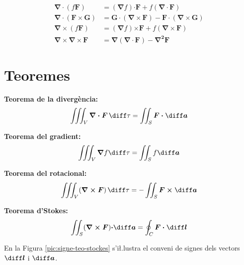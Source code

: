 \documentclass[catalan,a4paper,twoside,11pt]{article}
\begin{document}
\begin{align}
    \boldsymbol{\nabla\cdot}(f\boldsymbol{F}) &=
    (\boldsymbol{\nabla}f)\boldsymbol{\cdot F} + f(\boldsymbol{\nabla\cdot F})\\[0.5ex]
    \boldsymbol{\nabla\cdot}(\boldsymbol{F\times G}) &=
    \boldsymbol{G\cdot}(\boldsymbol{\nabla\times F}) -
    \boldsymbol{F\cdot}(\boldsymbol{\nabla\times G})\\[0.5ex]
    \boldsymbol{\nabla\times}(f\boldsymbol{F}) &=
    (\boldsymbol{\nabla}f)\boldsymbol{\times F} + f(\boldsymbol{\nabla\times F})\\[0.5ex]
    \boldsymbol{\nabla\times\nabla\times F} &= \boldsymbol{\nabla}(\boldsymbol{\nabla\cdot F})
    - \boldsymbol{\nabla^2 F}
\end{align}

\section{Teoremes }

\textbf{Teorema de la diverg\`{e}ncia:}
\begin{equation}
    \iiint_V\boldsymbol{\nabla\cdot F}\,\diff \tau = \iint_S\boldsymbol{F\cdot\diff a}
\end{equation}

\textbf{Teorema del gradient:}
\begin{equation}
    \iiint_V\boldsymbol{\nabla}f\diff \tau=\iint_S f\boldsymbol{\diff a}
\end{equation}

\textbf{Teorema del rotacional:}
\begin{equation}
    \iiint_V(\boldsymbol{\nabla\times F})\,\diff \tau=-\iint_S
    \boldsymbol{F\times\diff a}
\end{equation}

\textbf{Teorema d'Stokes:}
\begin{equation}
    \iint_S(\boldsymbol{\nabla\times F})\boldsymbol{\cdot\diff a} =
    \oint_C\boldsymbol{F\cdot\diff l}
\end{equation}

En la Figura \vref{pic:signe-teo-stockes} s'i{\l.l}ustra el conveni de
signes dels vectors $\boldsymbol{\diff l}$ i $\boldsymbol{\diff a}$.
\end{document}
